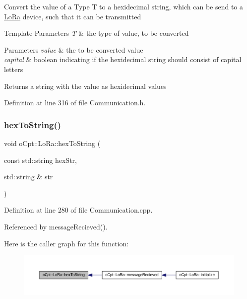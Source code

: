 Convert the value of a Type T to a hexidecimal string, which can be send to a \hyperlink{classo_cpt_1_1_lo_ra}{Lo\+Ra} device, such that it can be transmitted 
\begin{DoxyTemplParams}{Template Parameters}
{\em T} & the type of value, to be converted \\
\hline
\end{DoxyTemplParams}

\begin{DoxyParams}{Parameters}
{\em value} & the to be converted value \\
\hline
{\em capital} & boolean indicating if the hexidecimal string should consist of capital letters \\
\hline
\end{DoxyParams}
\begin{DoxyReturn}{Returns}
a string with the value as hexidecimal values 
\end{DoxyReturn}


Definition at line 316 of file Communication.\+h.

\hypertarget{classo_cpt_1_1_lo_ra_a9a85cc1457a2e791c4eb4d1805b416fc}{}\label{classo_cpt_1_1_lo_ra_a9a85cc1457a2e791c4eb4d1805b416fc} 
\subsubsection{\texorpdfstring{hex\+To\+String()}{hexToString()}}
{\footnotesize\ttfamily void o\+Cpt\+::\+Lo\+Ra\+::hex\+To\+String (\begin{DoxyParamCaption}\item[{const std\+::string}]{hex\+Str,  }\item[{std\+::string \&}]{str }\end{DoxyParamCaption})\hspace{0.3cm}{\ttfamily [protected]}}



Definition at line 280 of file Communication.\+cpp.



Referenced by message\+Recieved().

Here is the caller graph for this function\+:\nopagebreak
\begin{figure}[H]
\begin{center}
\leavevmode
\includegraphics[width=350pt]{classo_cpt_1_1_lo_ra_a9a85cc1457a2e791c4eb4d1805b416fc_icgraph}
\end{center}
\end{figure}
\hypertarget{classo_cpt_1_1_lo_ra_aa0646143f843d43fcd680344dfcb2a14}{}\label{classo_cpt_1_1_lo_ra_aa0646143f843d43fcd680344dfcb2a14} 
